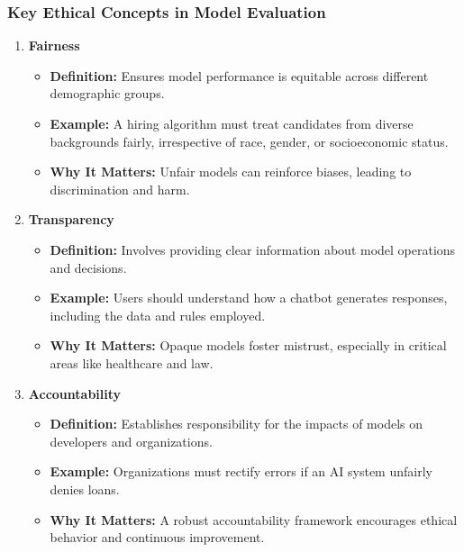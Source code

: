 \documentclass[aspectratio=169]{beamer}
\begin{document}
\begin{frame}[fragile]
  \frametitle{Key Ethical Concepts in Model Evaluation}
  \begin{enumerate}
    \item \textbf{Fairness}
      \begin{itemize}
        \item \textbf{Definition:} Ensures model performance is equitable across different demographic groups.
        \item \textbf{Example:} A hiring algorithm must treat candidates from diverse backgrounds fairly, irrespective of race, gender, or socioeconomic status.
        \item \textbf{Why It Matters:} Unfair models can reinforce biases, leading to discrimination and harm.
      \end{itemize}
    
    \item \textbf{Transparency}
      \begin{itemize}
        \item \textbf{Definition:} Involves providing clear information about model operations and decisions.
        \item \textbf{Example:} Users should understand how a chatbot generates responses, including the data and rules employed.
        \item \textbf{Why It Matters:} Opaque models foster mistrust, especially in critical areas like healthcare and law.
      \end{itemize}
    
    \item \textbf{Accountability}
      \begin{itemize}
        \item \textbf{Definition:} Establishes responsibility for the impacts of models on developers and organizations.
        \item \textbf{Example:} Organizations must rectify errors if an AI system unfairly denies loans.
        \item \textbf{Why It Matters:} A robust accountability framework encourages ethical behavior and continuous improvement.
      \end{itemize}
  \end{enumerate}
\end{frame}
\end{document}
